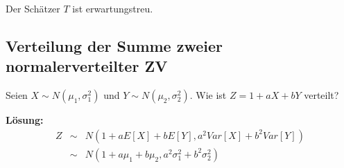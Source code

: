 \documentclass[10pt,a4paper,twocolumn]{article}
\begin{document}
Der Schätzer $T$ ist erwartungstreu.

\subsection{Verteilung der Summe zweier normalerverteilter ZV}
Seien $X\sim N(\mu_1,\sigma_1^2)$ und $Y\sim N(\mu_2,\sigma_2^2)$. Wie ist $Z=1+aX+bY$ verteilt?

\vspace{10pt}

\textbf{Lösung:} \\
\[
\begin{array}{rcl}
	Z & \sim & N(1+aE[X]+bE[Y],a^2Var[X]+b^2Var[Y]) \\
	& \sim & N(1+a\mu_1+b\mu_2,a^2\sigma_1^2+b^2\sigma_2^2) \\
\end{array}
\]
\end{document}
